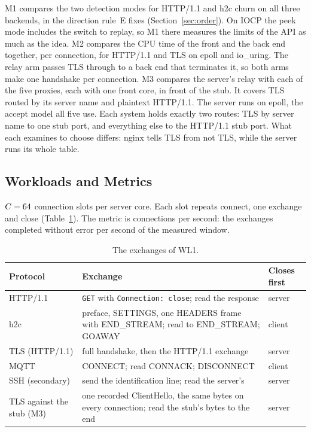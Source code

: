  M1 compares the two detection modes for HTTP/1.1 and h2c churn on all
three backends, in the direction rule~E fixes (Section~\ref{sec:order}). On IOCP the peek mode
includes the switch to replay, so M1 there measures the limits of the API as much as the idea.
M2 compares the CPU time of the front and the back end together, per connection, for HTTP/1.1
and TLS on epoll and io\_uring. The relay arm passes TLS through to a back end that terminates
it, so both arms make one handshake per connection. M3 compares the server's relay with each of
the five proxies, each with one front core, in front of the stub. It covers TLS routed by its
server name and plaintext HTTP/1.1. The server runs on epoll, the accept model all five use. Each system holds
exactly two routes: TLS by server name to one stub port, and everything else to the HTTP/1.1 stub
port. What each examines to choose differs: nginx tells TLS from not TLS, while the server runs
its whole table.

\subsection{Workloads and Metrics}\label{sec:workloads}

 $C = 64$ connection slots per server core. Each slot
repeats connect, one exchange and close (Table~\ref{tab:exchanges}). The metric is connections
per second: the exchanges completed without error per second of the measured window.

\begin{table}[H]
\caption{The exchanges of WL1.\label{tab:exchanges}}
\centering\small
\begin{tabularx}{\textwidth}{@{}l X l@{}}
\toprule
\textbf{Protocol} & \textbf{Exchange} & \textbf{Closes first} \\
\midrule
HTTP/1.1 & \texttt{GET} with \texttt{Connection: close}; read the response & server \\
h2c & preface, SETTINGS, one HEADERS frame with END\_STREAM; read to END\_STREAM; GOAWAY & client \\
TLS (HTTP/1.1) & full handshake, then the HTTP/1.1 exchange & server \\
MQTT & CONNECT; read CONNACK; DISCONNECT & client \\
SSH (secondary) & send the identification line; read the server's & server \\
TLS against the stub (M3) & one recorded ClientHello, the same bytes on every connection; read the
stub's \BodyBytes{} bytes to the end & server \\
\bottomrule
\end{tabularx}
\end{table}


